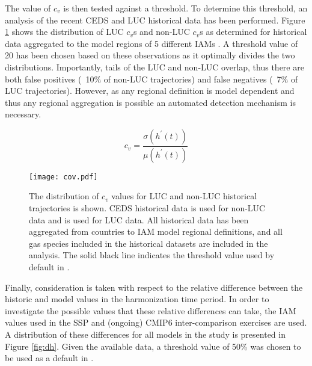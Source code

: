 The value of $c_v$ is then tested against a threshold. To determine this
threshold, an analysis of the recent CEDS and LUC historical data has been
performed. Figure \ref{fig:cov} shows the distribution of LUC $c_v$s and non-LUC
$c_v$s as determined for historical data aggregated to the model regions of 5
different IAMs . A threshold value of 20 has been chosen based on these
observations as it optimally divides the two distributions. Importantly, tails
of the LUC and non-LUC overlap, thus there are both false positives (~10\% of
non-LUC trajectories) and false negatives (~7\% of LUC trajectories). However,
% 
% 
as any regional definition is model dependent and thus any regional aggregation
is possible an automated detection mechanism is necessary.

\begin{equation}\label{eqs:cov}
% 
% 
    c_v =  \frac{\sigma(h^{\prime}(t))}{\mu(h^{\prime}(t))}
\end{equation}


\begin{figure}
  \begin{center}
    \texttt{[image: cov.pdf]}
    \caption[]{
      \label{fig:cov}
      The distribution of $c_v$ values for LUC and non-LUC historical
      trajectories is shown. CEDS historical data \cite{hoesly_historical_2017}
      is used for non-LUC data and \cite{van_marle_historic_2017} is used for
      LUC data. All historical data has been aggregated from countries to IAM
      model regional definitions, and all gas species included in the historical
      datasets are included in the analysis. The solid black line indicates the
      threshold value used by default in .  }
  \end{center}
\end{figure}

Finally, consideration is taken with respect to the relative difference between
the historic and model values in the harmonization time period. In order to
investigate the possible values that these relative differences can take, the
IAM values used in the SSP and (ongoing) CMIP6 inter-comparison
exercises are used. A distribution of these differences for all models in the
study is presented in Figure \ref{fig:dh}. Given the available data, a threshold
value of 50\% was chosen to be used as a default in .
% 
% 

